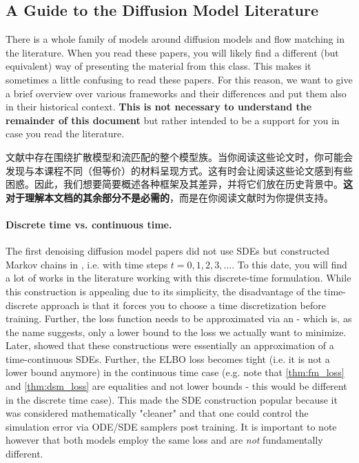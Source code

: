 
\subsection{A Guide to the  Diffusion Model Literature}
\label{subsec:guide_to_flow_matching_literature}

There is a whole family of models around diffusion models and flow matching in the literature. When you read these papers, you will likely find a different (but equivalent) way of presenting the material from this class. This makes it sometimes a little confusing to read these papers. For this reason, we want to give a brief overview over various frameworks and their differences and put them also in their historical context. \textbf{This is not necessary to understand the remainder of this document} but rather intended to be a support for you in case you read the literature.

文献中存在围绕扩散模型和流匹配的整个模型族。当你阅读这些论文时，你可能会发现与本课程不同（但等价）的材料呈现方式。这有时会让阅读这些论文感到有些困惑。因此，我们想要简要概述各种框架及其差异，并将它们放在历史背景中。\textbf{这对于理解本文档的其余部分不是必需的}，而是在你阅读文献时为你提供支持。

\paragraph{Discrete time vs. continuous time.} The first denoising diffusion model papers \citep{sohl2015deep, song2019generative, ho2020denoising} did not use SDEs but constructed Markov chains in , i.e. with time steps $t=0,1,2,3,\dots$. To this date, you will find a lot of works in the literature working with this discrete-time formulation. While this construction is appealing due to its simplicity, the disadvantage of the time-discrete approach is that it forces you to choose a time discretization before training. Further, the loss function needs to be approximated via an  - which is, as the name suggests, only a lower bound to the loss we actually want to minimize. Later, \citet{song2020score} showed that these constructions were essentially an approximation of a time-continuous SDEs. Further, the ELBO loss becomes tight (i.e. it is not a lower bound anymore) in the continuous time case (e.g. note that \cref{thm:fm_loss} and \cref{thm:dsm_loss} are equalities and not lower bounds - this would be different in the discrete time case). This made the SDE construction popular because it was considered mathematically "cleaner" and that one could control the simulation error via ODE/SDE samplers post training. It is important to note however that both models employ the same loss and are \textit{not} fundamentally different.

